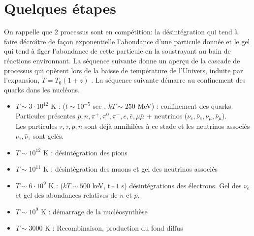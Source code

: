 \section{Quelques étapes}
On rappelle que 2 processus sont en compétition: la désintégration qui tend à faire décroître de façon exponentielle l'abondance d'une particule donnée et le gel qui tend à figer l'abondance de cette particule en la soustrayant au bain de réactions environnant. La séquence suivante donne un aperçu de la cascade de processus qui opèrent lors de la baisse de température de l'Univers, induite par l'expansion, $T=T_0(1+z)$ . La séquence suivante démarre au confinement des quarks dans les nucléons.
\newline
\begin{itemize}
\item $T\sim 3\cdot 10^{12}$ K : ($t\sim 10^{-5}$ sec , $kT \sim 250$ MeV) : confinement des quarks. Particules présentes $p,n, \pi^+,\pi^0, \pi^-, e,\bar e, \mu \bar \mu$ + neutrinos ($\nu_e,\bar \nu_e, \nu_\mu, \bar \nu_\mu$).\\
Les particules $\tau, \bar \tau, \bar p, \bar n$  sont déjà annihilées à ce stade et les neutrinos associés $\nu_\tau, \bar \nu_\tau$ sont gelés.
 \item $T\sim 10^{12}$ K : désintégration des pions
 \item $T\sim 10^{11}$ K : désintégration des muons et gel des neutrinos associés
 \item $T\sim 6 \cdot 10^{9}$ K : ($kT \sim 500$ keV, t$\sim 1$ s) désintégrations des électrons. Gel des $\nu_e$ et gel des abondances relatives de $n$ et $p$.
 \item $T\sim 10^9$ K : démarrage de la nucléosynthèse
 \item $T\sim 3000$ K : Recombinaison, production du fond diffus
\end{itemize}

